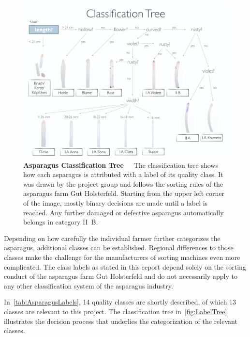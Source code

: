 \begin{figure}[!b]
	\centering
	\includegraphics[scale=0.39]{Figures/chapter01/treewithtitle.png}
	\decoRule
	\caption[Asparagus Classification Tree]{\textbf{Asparagus Classification Tree}~~~The classification tree shows how each asparagus is attributed with a label of its quality class. It was drawn by the project group and follows the sorting rules of the asparagus farm Gut Holsterfeld. Starting from the upper left corner of the image, mostly binary decisions are made until a label is reached. Any further damaged or defective asparagus automatically belongs in category II~B.}
	\label{fig:LabelTree}
\end{figure}

\bigskip
Depending on how carefully the individual farmer further categorizes the asparagus, additional classes can be established. Regional differences to those classes make the challenge for the manufacturers of sorting machines even more complicated. The class labels as stated in this report depend solely on the sorting conduct of the asparagus farm Gut Holsterfeld and do not necessarily apply to any other classification system of the asparagus industry.

In~\autoref{tab:AsparagusLabels}, 14 quality classes are shortly described, of which 13 classes are relevant to this project. The classification tree in~\autoref{fig:LabelTree} illustrates the decision process that underlies the categorization of the relevant classes.

